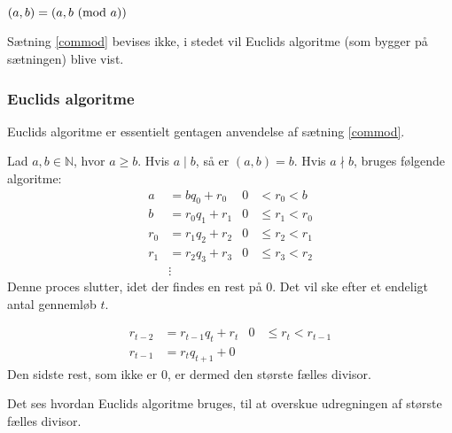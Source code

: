 \begin{sent}
    \label{commod}
    \((a, b) = (a, b \ (\mathrm{mod}\ a))\)
\end{sent}

Sætning \ref{commod} bevises ikke, i stedet vil Euclids algoritme (som bygger på sætningen) blive vist.

\subsubsection{Euclids algoritme}
Euclids algoritme er essentielt gentagen anvendelse af sætning \ref{commod}.
\begin{definition}
    Lad \(a, b \in \mathbb{N}\), hvor \(a \geq b\).
    Hvis \(a \mid b\), så er \((a, b) = b\).
    Hvis \(a \nmid b\), bruges følgende algoritme:
    \begin{align*}
        a   &= b q_0    + r_0   & 0 &<    r_0 < b\\
        b   &= r_0 q_1  + r_1   & 0 &\leq r_1 < r_0\\
        r_0 &= r_1 q_2  + r_2   & 0 &\leq r_2 < r_1\\
        r_1 &= r_2 q_3  + r_3   & 0 &\leq r_3 < r_2\\
        &\vdots
    \end{align*}
    Denne proces slutter, idet der findes en rest på 0.
    Det vil ske efter et endeligt antal gennemløb \(t\).

    \begin{align*}
        r_{t-2} &= r_{t-1}  q_t      + r_t   & 0 &\leq r_t < r_{t-1}\\
        r_{t-1} &= r_t      q_{t+1}  + 0
    \end{align*}
    Den sidste rest, som ikke er 0, er dermed den største fælles divisor.\cite[11]{absalg}
\end{definition}

Det ses hvordan Euclids algoritme bruges, til at overskue udregningen af største fælles divisor.

